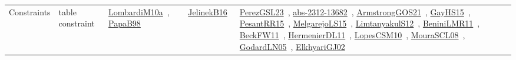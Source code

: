 {\begin{longtable}{lp{3cm}>{\raggedright\arraybackslash}p{6cm}>{\raggedright\arraybackslash}p{6cm}>{\raggedright\arraybackslash}p{8cm}}
Constraints & table constraint & \href{works/LombardiM10a.pdf}{LombardiM10a}~\cite{LombardiM10a}, \href{works/PapaB98.pdf}{PapaB98}~\cite{PapaB98} & \href{works/JelinekB16.pdf}{JelinekB16}~\cite{JelinekB16} & \href{works/PerezGSL23.pdf}{PerezGSL23}~\cite{PerezGSL23}, \href{works/abs-2312-13682.pdf}{abs-2312-13682}~\cite{abs-2312-13682}, \href{works/ArmstrongGOS21.pdf}{ArmstrongGOS21}~\cite{ArmstrongGOS21}, \href{works/GayHS15.pdf}{GayHS15}~\cite{GayHS15}, \href{works/PesantRR15.pdf}{PesantRR15}~\cite{PesantRR15}, \href{works/MelgarejoLS15.pdf}{MelgarejoLS15}~\cite{MelgarejoLS15}, \href{works/LimtanyakulS12.pdf}{LimtanyakulS12}~\cite{LimtanyakulS12}, \href{works/BeniniLMR11.pdf}{BeniniLMR11}~\cite{BeniniLMR11}, \href{works/BeckFW11.pdf}{BeckFW11}~\cite{BeckFW11}, \href{works/HermenierDL11.pdf}{HermenierDL11}~\cite{HermenierDL11}, \href{works/LopesCSM10.pdf}{LopesCSM10}~\cite{LopesCSM10}, \href{works/MouraSCL08.pdf}{MouraSCL08}~\cite{MouraSCL08}, \href{works/GodardLN05.pdf}{GodardLN05}~\cite{GodardLN05}, \href{works/ElkhyariGJ02.pdf}{ElkhyariGJ02}~\cite{ElkhyariGJ02}\\
\end{longtable}
}

